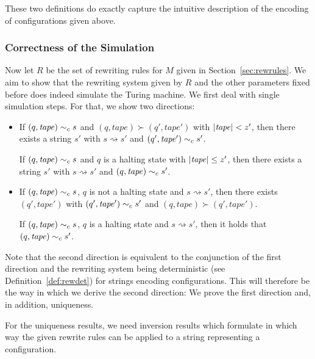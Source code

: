 \documentclass[a4paper,UKenglish,cleveref, autoref]{lipics-v2019}
\newcommand{\strent}{\rightsquigarrow}
\begin{document}
These two definitions do exactly capture the intuitive description of the encoding of configurations given above. 

\subsubsection{Correctness of the Simulation}
Now let $R$ be the set of rewriting rules for $M$ given in Section~\ref{sec:rewrules}. We aim to show that the rewriting system given by $R$ and the other parameters fixed before does indeed simulate the Turing machine. We first deal with single simulation steps. For that, we show two directions:
\begin{itemize}
  \item If $(q, \mathit{tape}) \sim_c s$ and $(q, \mathit{tape}) \succ (q', \mathit{tape}')$ with $|\mathit{tape}| < z'$, then there exists a string $s'$ with $s \strent{} s'$ and $(q', \mathit{tape'}) \sim_c s'$. 

    If $(q, \mathit{tape}) \sim_c s$ and $q$ is a halting state with $|\mathit{tape}| \le z'$, then there exists a string $s'$ with $s \strent{} s'$ and $(q, \mathit{tape}) \sim_c s'$. 
  \item If $(q, \mathit{tape}) \sim_c s$, $q$ is not a halting state and $s \strent{} s'$, then there exists $(q', \mathit{tape}')$ with $(q', \mathit{tape}') \sim_c{} s'$ and $(q, \mathit{tape}) \succ (q', \mathit{tape'})$. 

    If $(q, \mathit{tape}) \sim_c s$, $q$ is a halting state and $s \strent{} s'$, then it holds that $(q, \mathit{tape}) \sim_c{} s'$. 
\end{itemize}

Note that the second direction is equivalent to the conjunction of the first direction and the rewriting system being deterministic (see Definition~\ref{def:rewdet}) for strings encoding configurations. This will therefore be the way in which we derive the second direction: We prove the first direction and, in addition, uniqueness.

For the uniqueness results, we need inversion results which formulate in which way the given rewrite rules can be applied to a string representing a configuration. 
\end{document}
